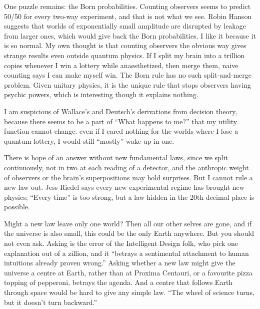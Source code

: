 One puzzle remains: the Born probabilities. Counting observers seems to predict 50/50 for every two-way experiment, and that is not what we see. Robin Hanson suggests that worlds of exponentially small amplitude are disrupted by leakage from larger ones, which would give back the Born probabilities. I like it because it is so normal. My own thought is that counting observers the obvious way gives strange results even outside quantum physics. If I split my brain into a trillion copies whenever I win a lottery while anaesthetized, then merge them, naive counting says I can make myself win. The Born rule has no such split-and-merge problem. Given unitary physics, it is the unique rule that stops observers having psychic powers, which is interesting though it explains nothing.

I am suspicious of Wallace's and Deutsch's derivations from decision theory, because there seems to be a part of ``What happens to me?'' that my utility function cannot change: even if I cared nothing for the worlds where I lose a quantum lottery, I would still ``mostly'' wake up in one. 

There is hope of an answer without new fundamental laws, since we split continuously, not in two at each reading of a detector, and the anthropic weight of observers or the brain's superpositions may hold surprises. But I cannot rule a new law out. Jess Riedel says every new experimental regime has brought new physics; ``Every time'' is too strong, but a law hidden in the 20th decimal place is possible.

Might a new law leave only one world? Then all our other selves are gone, and if the universe is also small, this could be the only Earth anywhere. But you should not even ask. Asking is the error of the Intelligent Design folk, who pick one explanation out of a zillion, and it ``betrays a sentimental attachment to human intuitions already proven wrong.'' Asking whether a new law might give the universe a centre at Earth, rather than at Proxima Centauri, or a favourite pizza topping of pepperoni, betrays the agenda. And a centre that follows Earth through space would be hard to give any simple law. ``The wheel of science turns, but it doesn't turn backward.'' 


